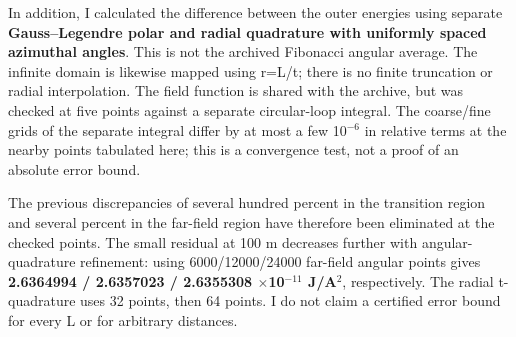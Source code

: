 \documentclass[10pt,a4paper]{article}
\begin{document}
{\par
In addition, I calculated the difference between the outer energies using separate \textbf{Gauss--Legendre polar and radial quadrature with uniformly spaced azimuthal angles}. This is not the archived Fibonacci angular average. The infinite domain is likewise mapped using r=L/t; there is no finite truncation or radial interpolation. The field function is shared with the archive, but was checked at five points against a separate circular-loop integral. The coarse/fine grids of the separate integral differ by at most a few 10$^{-6}$ in relative terms at the nearby points tabulated here; this is a convergence test, not a proof of an absolute error bound.
\par
\begin{center}\vspace{-2pt}\end{center}
\par
The previous discrepancies of several hundred percent in the transition region and several percent in the far-field region have therefore been eliminated at the checked points. The small residual at 100 m decreases further with angular-quadrature refinement: using 6000/12000/24000 far-field angular points gives \textbf{2.6364994 / 2.6357023 / 2.6355308 $\times$10$^{-11}$ J/A$^2$}, respectively. The radial t-quadrature uses 32 points, then 64 points. I do not claim a certified error bound for every L or for arbitrary distances.
}
\end{document}
